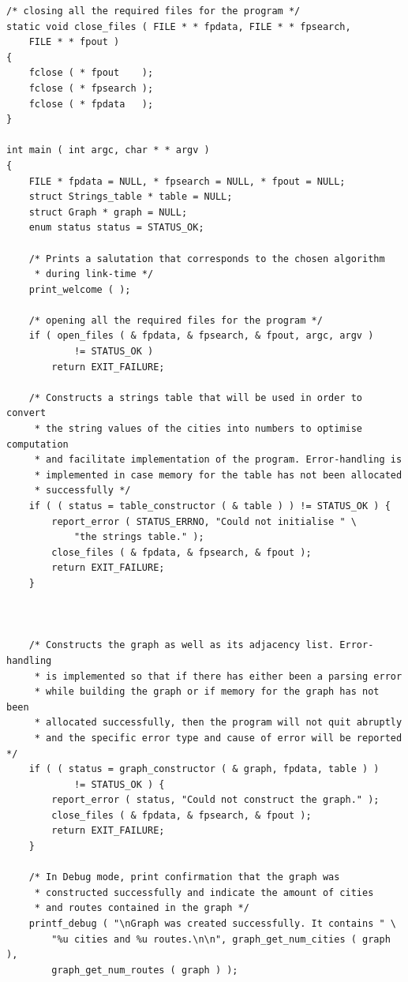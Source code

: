 \documentclass[11pt]{article}
\begin{document}
\begin{verbatim}
/* closing all the required files for the program */
static void close_files ( FILE * * fpdata, FILE * * fpsearch,
    FILE * * fpout )
{
    fclose ( * fpout    );
    fclose ( * fpsearch );
    fclose ( * fpdata   );
}

int main ( int argc, char * * argv )
{
    FILE * fpdata = NULL, * fpsearch = NULL, * fpout = NULL;
    struct Strings_table * table = NULL;
    struct Graph * graph = NULL;
    enum status status = STATUS_OK;

    /* Prints a salutation that corresponds to the chosen algorithm
     * during link-time */
    print_welcome ( );

    /* opening all the required files for the program */
    if ( open_files ( & fpdata, & fpsearch, & fpout, argc, argv )
            != STATUS_OK )
        return EXIT_FAILURE;

    /* Constructs a strings table that will be used in order to convert
     * the string values of the cities into numbers to optimise computation
     * and facilitate implementation of the program. Error-handling is
     * implemented in case memory for the table has not been allocated
     * successfully */
    if ( ( status = table_constructor ( & table ) ) != STATUS_OK ) {
        report_error ( STATUS_ERRNO, "Could not initialise " \
            "the strings table." );
        close_files ( & fpdata, & fpsearch, & fpout );
        return EXIT_FAILURE;
    }

    
    
    /* Constructs the graph as well as its adjacency list. Error-handling
     * is implemented so that if there has either been a parsing error
     * while building the graph or if memory for the graph has not been
     * allocated successfully, then the program will not quit abruptly
     * and the specific error type and cause of error will be reported */
    if ( ( status = graph_constructor ( & graph, fpdata, table ) )
            != STATUS_OK ) {
        report_error ( status, "Could not construct the graph." );
        close_files ( & fpdata, & fpsearch, & fpout );
        return EXIT_FAILURE;
    }

    /* In Debug mode, print confirmation that the graph was
     * constructed successfully and indicate the amount of cities
     * and routes contained in the graph */
    printf_debug ( "\nGraph was created successfully. It contains " \
        "%u cities and %u routes.\n\n", graph_get_num_cities ( graph ),
        graph_get_num_routes ( graph ) );


\end{verbatim}
\end{document}
